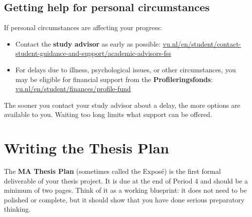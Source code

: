\documentclass[
  11pt,
  a4paper,
]{scrbook}
\providecommand{\tightlist}{%
  \setlength{\itemsep}{0pt}\setlength{\parskip}{0pt}}\usepackage{longtable,booktabs,array}
\begin{document}
\section{Getting help for personal
circumstances}\label{getting-help-for-personal-circumstances}

If personal circumstances are affecting your progress:

\begin{itemize}
\tightlist
\item
  Contact the \textbf{study advisor} as early as possible:
  \href{https://vu.nl/en/student/contact-student-guidance-and-support/academic-advisors-fss}{vu.nl/en/student/contact-student-guidance-and-support/academic-advisors-fss}
\item
  For delays due to illness, psychological issues, or other
  circumstances, you may be eligible for financial support from the
  \textbf{Profileringsfonds}:
  \href{https://vu.nl/en/student/finances/profile-fund}{vu.nl/en/student/finances/profile-fund}
\end{itemize}

\begin{tcolorbox}[enhanced jigsaw, bottomrule=.15mm, opacityback=0, toprule=.15mm, colframe=quarto-callout-tip-color-frame, left=2mm, rightrule=.15mm, title=\textcolor{quarto-callout-tip-color}{\faLightbulb}\hspace{0.5em}{Report delays early}, colbacktitle=quarto-callout-tip-color!10!white, bottomtitle=1mm, colback=white, breakable, toptitle=1mm, titlerule=0mm, leftrule=.75mm, arc=.35mm, opacitybacktitle=0.6, coltitle=black]

The sooner you contact your study advisor about a delay, the more
options are available to you. Waiting too long limits what support can
be offered.

\end{tcolorbox}

\chapter{Writing the Thesis Plan}\label{writing-the-thesis-plan}

The \textbf{MA Thesis Plan} (sometimes called the Exposé) is the first
formal deliverable of your thesis project. It is due at the end of
Period 4 and should be a minimum of two pages. Think of it as a working
blueprint: it does not need to be polished or complete, but it should
show that you have done serious preparatory thinking.
\end{document}
